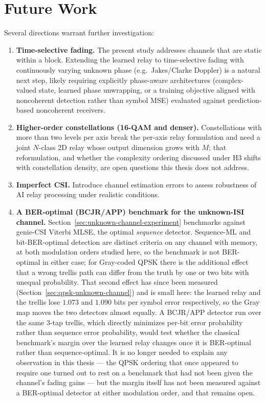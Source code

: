 \section{Future Work}\label{sec:future-work}

Several directions warrant further investigation:

\begin{enumerate}
\def\labelenumi{\arabic{enumi}.}
\item
  \textbf{Time-selective fading.} The present study addresses channels that are static within a block. Extending the learned relay to time-selective fading with continuously varying unknown phase (e.g.\ Jakes/Clarke Doppler) is a natural next step, likely requiring explicitly phase-aware architectures (complex-valued state, learned phase unwrapping, or a training objective aligned with noncoherent detection rather than symbol MSE) evaluated against prediction-based noncoherent receivers.
\item
  \textbf{Higher-order constellations (16-QAM and denser).} Constellations with more than two levels per axis break the per-axis relay formulation and need a joint $N$-class 2D relay whose output dimension grows with $M$; that reformulation, and whether the complexity ordering discussed under H3 shifts with constellation density, are open questions this thesis does not address.
\item
  \textbf{Imperfect CSI.} Introduce channel estimation errors to assess robustness of AI relay processing under realistic conditions.
\item
  \textbf{A BER-optimal (BCJR/APP) benchmark for the unknown-ISI channel.} Section~\ref{sec:unknown-channel-experiment} benchmarks against genie-CSI Viterbi MLSE, the optimal \emph{sequence} detector. Sequence-ML and bit-BER-optimal detection are distinct criteria on any channel with memory, at both modulation orders studied here, so the benchmark is not BER-optimal in either case; for Gray-coded QPSK there is the additional effect that a wrong trellis path can differ from the truth by one or two bits with unequal probability. That second effect has since been measured (Section~\ref{sec:qpsk-unknown-channel}) and is small here: the learned relay and the trellis lose $1.073$ and $1.090$ bits per symbol error respectively, so the Gray map moves the two detectors almost equally. A BCJR/APP detector run over the same 3-tap trellis, which directly minimizes per-bit error probability rather than sequence error probability, would test whether the classical benchmark's margin over the learned relay changes once it is BER-optimal rather than sequence-optimal. It is no longer needed to explain any observation in this thesis --- the QPSK ordering that once appeared to require one turned out to rest on a benchmark that had not been given the channel's fading gains --- but the margin itself has not been measured against a BER-optimal detector at either modulation order, and that remains open.

\end{enumerate}
